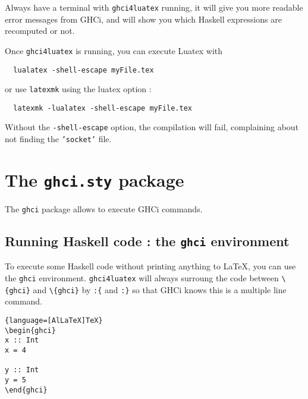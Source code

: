 \documentclass{article}
\begin{document}
\begin{tipbox}
Always have a terminal with \texttt{ghci4luatex} running, it will give you more readable error messages from GHCi, and will show you which Haskell expressions are recomputed or not.
\end{tipbox}


Once \texttt{ghci4luatex} is running, you can execute Luatex with

\begin{verbatim}
  lualatex -shell-escape myFile.tex
\end{verbatim}

or use \texttt{latexmk} using the luatex option :

\begin{verbatim}
  latexmk -lualatex -shell-escape myFile.tex
\end{verbatim}

\begin{warningbox}
  Without the \texttt{-shell-escape} option, the compilation will fail, complaining about not finding the \texttt{'socket'} file.
\end{warningbox}

\section{The \texttt{ghci.sty} package}

The \texttt{ghci} package allows to execute GHCi commands.

\subsection{Running Haskell code : the \texttt{ghci} environment}

To execute some Haskell code without printing anything to LaTeX, you can use the \texttt{ghci} environment. \texttt{ghci4luatex} will always surroung the code between \texttt{\textbackslash {}\{ghci\}} and  \texttt{\textbackslash {}\{ghci\}} by \texttt{:\{} and \texttt{:\}} so that GHCi knows this is a multiple line command.

\begin{latexbox}
\begin{lstlisting}{language=[AlLaTeX]TeX}
\begin{ghci}
x :: Int
x = 4

y :: Int
y = 5
\end{ghci}
\end{lstlisting}
\end{latexbox}
\end{document}

